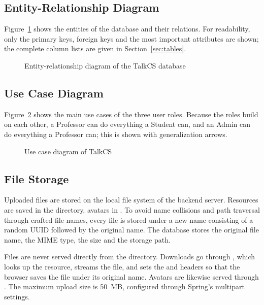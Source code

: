 \subsection{Entity-Relationship Diagram}

Figure~\ref{fig:er} shows the entities of the database and their relations. For
readability, only the primary keys, foreign keys and the most important attributes are
shown; the complete column lists are given in Section~\ref{sec:tables}.

\begin{figure}[p]
  \centering
  
  \caption{Entity-relationship diagram of the TalkCS database}
  \label{fig:er}
\end{figure}



\subsection{Use Case Diagram}

Figure~\ref{fig:usecase} shows the main use cases of the three user roles. Because
the roles build on each other, a Professor can do everything a Student can, and an
Admin can do everything a Professor can; this is shown with generalization arrows.

\begin{figure}[htbp]
  \centering
  
  \caption{Use case diagram of TalkCS}
  \label{fig:usecase}
\end{figure}

\subsection{File Storage}

Uploaded files are stored on the local file system of the backend server. Resources are
saved in the  directory, avatars in . To avoid
name collisions and path traversal through crafted file names, every file is stored
under a new name consisting of a random UUID followed by the original name. The
database stores the original file name, the MIME type, the size and the storage path.

Files are never served directly from the directory. Downloads go through
, which looks up the resource, streams the
file, and sets the  and  headers so that
the browser saves the file under its original name. Avatars are likewise served
through . The maximum upload size is 50~MB,
configured through Spring's multipart settings.

